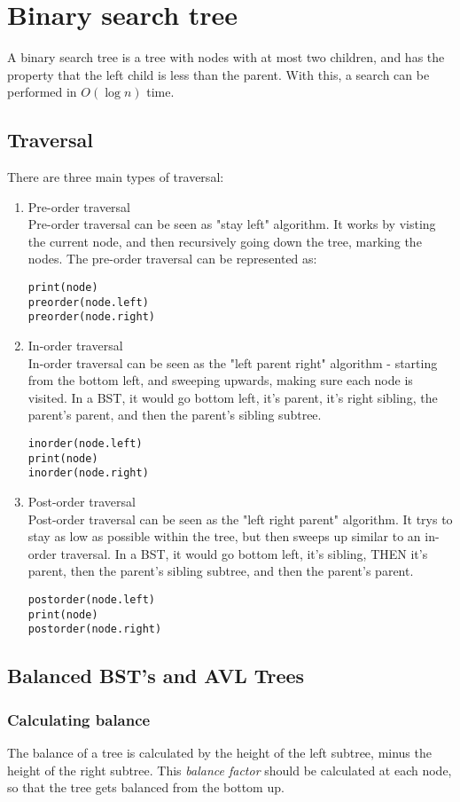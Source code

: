 \documentclass[14]{article}
\begin{document}
\section{Binary search tree}
A binary search tree is a tree with nodes with at most two children, and has the property that the left child is less than the parent.
With this, a search can be performed in $O(\log n)$ time.
\subsection{Traversal}
There are three main types of traversal: 
\begin{enumerate}
	\item Pre-order traversal \\
	Pre-order traversal can be seen as "stay left" algorithm. It works by visting the current node, and then recursively 
	going down the tree, marking the nodes. The pre-order traversal can be represented as:
	\begin{verbatim}
print(node)
preorder(node.left)
preorder(node.right)
	\end{verbatim}
	\item In-order traversal \\
	In-order traversal can be seen as the "left parent right" algorithm - starting from the bottom left, and sweeping upwards,
	making sure each node is visited. In a BST, it would go bottom left, it's parent, it's right sibling, 
	the parent's parent, and then the parent's sibling subtree.
	\begin{verbatim}
inorder(node.left)
print(node)
inorder(node.right)
	\end{verbatim}
	\item Post-order traversal \\
	Post-order traversal can be seen as the "left right parent" algorithm. It trys to stay as low as possible within the tree,
	but then sweeps up similar to an in-order traversal. In a BST, it would go bottom left, it's sibling, THEN it's parent,
	then the parent's sibling subtree, and then the parent's parent.
	\begin{verbatim}
postorder(node.left)
print(node)
postorder(node.right)
	\end{verbatim}
\end{enumerate}
\pagebreak
\subsection{Balanced BST's and AVL Trees}
\subsubsection{Calculating balance}
The balance of a tree is calculated by the height of the left subtree, minus the height of the right subtree.
This \emph{balance factor} should be calculated at each node, so that the tree gets balanced from the bottom up.
\end{document}
